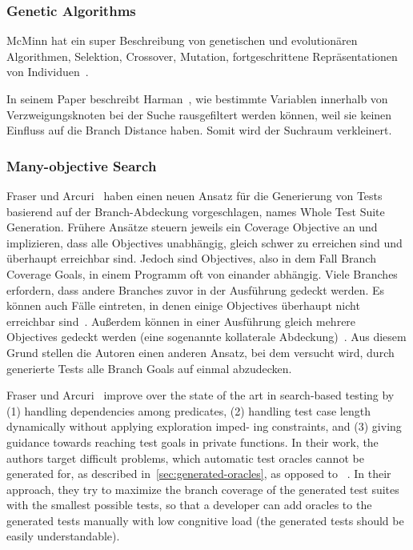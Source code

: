 \documentclass{article}
\begin{document}
\subsubsection{Genetic Algorithms}
McMinn hat ein super Beschreibung von genetischen und evolutionären Algorithmen, Selektion, Crossover, Mutation, fortgeschrittene Repräsentationen von Individuen~\cite{McMinn_2004}.

In seinem Paper beschreibt Harman~\cite{Harman}, wie bestimmte Variablen innerhalb von Verzweigungsknoten bei der Suche rausgefiltert werden können, weil sie keinen Einfluss auf die Branch Distance haben. Somit wird der Suchraum verkleinert. 

\subsubsection{Many-objective Search}
 Fraser und Arcuri~\cite{Fraser_2013} haben einen neuen Ansatz für die Generierung von Tests basierend auf der Branch-Abdeckung vorgeschlagen, names Whole Test Suite Generation. Frühere Ansätze steuern jeweils ein Coverage Objective an und implizieren, dass alle Objectives unabhängig, gleich schwer zu erreichen sind und überhaupt erreichbar sind. Jedoch sind Objectives, also in dem Fall Branch Coverage Goals, in einem Programm oft von einander abhängig. Viele Branches erfordern, dass andere Branches zuvor in der Ausführung gedeckt werden. Es können auch Fälle eintreten, in denen einige Objectives überhaupt nicht erreichbar sind~\cite{Goldberg_1994}. Außerdem können in einer Ausführung gleich mehrere Objectives gedeckt werden (eine sogenannte kollaterale Abdeckung)~\cite{Fraser_2011}. Aus diesem Grund stellen die Autoren einen anderen Ansatz, bei dem versucht wird, durch generierte Tests alle Branch Goals auf einmal abzudecken. 

Fraser und Arcuri~\cite{Fraser_2011} improve over the state of the art in search-based testing by (1) handling dependencies among predicates, (2) handling test case length dynamically without applying exploration imped- ing constraints, and (3) giving guidance towards reaching test goals in private functions. In their work, the authors target difficult problems, which automatic test oracles cannot be generated for, as described in~\cref{sec:generated-oracles}, as opposed to~\cite{Pacheco_2007, Godefroid_2005} . In their approach, they try to maximize the branch coverage of the generated test suites with the smallest possible tests, so that a developer can add oracles to the generated tests manually with low congnitive load (the generated tests should be easily understandable).
\end{document}
